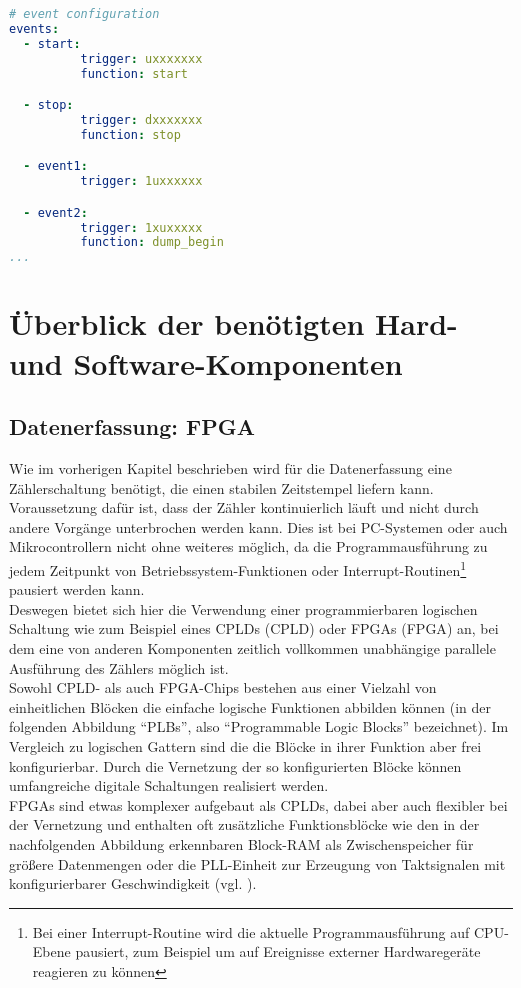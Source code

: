 \begin{lstlisting}[language=yaml]
# event configuration
events: 
  - start:
          trigger: uxxxxxxx
          function: start

  - stop:
          trigger: dxxxxxxx
          function: stop

  - event1:
          trigger: 1uxxxxxx

  - event2:
          trigger: 1xuxxxxx
          function: dump_begin
...
\end{lstlisting}

\clearpage
\section{Überblick der benötigten Hard- und Software-Komponenten}
\subsection{Datenerfassung: FPGA}
Wie im vorherigen Kapitel beschrieben wird für die Datenerfassung eine Zählerschaltung benötigt, die einen stabilen Zeitstempel liefern kann. Voraussetzung dafür ist, dass der Zähler kontinuierlich läuft und nicht durch andere Vorgänge unterbrochen werden kann. Dies ist bei PC-Systemen oder auch Mikrocontrollern nicht ohne weiteres möglich, da die Programmausführung zu jedem Zeitpunkt von Betriebssystem-Funktionen oder Interrupt-Routinen\footnote{Bei einer Interrupt-Routine wird die aktuelle Programmausführung auf CPU-Ebene pausiert, zum Beispiel um auf Ereignisse externer Hardwaregeräte reagieren zu können} pausiert werden kann.\\
Deswegen bietet sich hier die Verwendung einer programmierbaren logischen Schaltung wie zum Beispiel eines CPLDs (\acrlong{CPLD}) oder FPGAs (\acrlong{FPGA}) an, bei dem eine von anderen Komponenten zeitlich vollkommen unabhängige parallele Ausführung des Zählers möglich ist.\\
Sowohl CPLD- als auch FPGA-Chips bestehen aus einer Vielzahl von einheitlichen Blöcken die einfache logische Funktionen abbilden können (in der folgenden Abbildung ``PLBs'', also ``Programmable Logic Blocks'' bezeichnet). Im Vergleich zu logischen Gattern sind die die Blöcke in ihrer Funktion aber frei konfigurierbar. Durch die Vernetzung der so konfigurierten Blöcke können umfangreiche digitale Schaltungen realisiert werden.\\
FPGAs sind etwas komplexer aufgebaut als CPLDs, dabei aber auch flexibler bei der Vernetzung und enthalten oft zusätzliche Funktionsblöcke wie den in der nachfolgenden Abbildung erkennbaren Block-RAM als Zwischenspeicher für größere Datenmengen oder die \acrshort{PLL}-Einheit zur Erzeugung von Taktsignalen mit konfigurierbarer Geschwindigkeit (vgl. \cite{wiki:PLD}).

